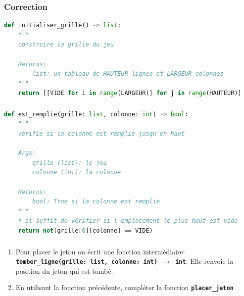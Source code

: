 \documentclass[svgnames,11pt]{beamer}
\begin{document}
\begin{frame}[fragile]
    \frametitle{Correction}

\begin{center}
\begin{lstlisting}[language=Python , basicstyle=\ttfamily\small, xleftmargin=1em, xrightmargin=0em]
def initialiser_grille() -> list:
    """
    construire la grille du jeu

    Returns:
        list: un tableau de HAUTEUR lignes et LARGEUR colonnes
    """
    return [[VIDE for i in range(LARGEUR)] for j in range(HAUTEUR)]
\end{lstlisting}
\label{CODE}
\end{center}  

\end{frame}
\begin{frame}[fragile]
    \frametitle{}
\begin{center}
\begin{lstlisting}[language=Python , basicstyle=\ttfamily\small, xleftmargin=1em, xrightmargin=-.5em]
def est_remplie(grille: list, colonne: int) -> bool:
    """
    vérifie si la colonne est remplie jusqu'en haut

    Args:
        grille (list): le jeu
        colonne (int): la colonne

    Returns:
        bool: True si la colonne est remplie
    """
    # il suffit de vérifier si l'emplacement le plus haut est vide
    return not(grille[0][colonne] == VIDE)
\end{lstlisting}
\label{CODE}
\end{center}
    

\end{frame}
\begin{frame}
    \frametitle{}

    \begin{activite}    
        \begin{enumerate}
            \item Pour placer le jeton on écrit une fonction intermédiaire: \textbf{\texttt{tomber\_ligne(grille: list, colonne: int) $\rightarrow$ int}}. Elle renvoie la position du jeton qui est tombé.
            \item En utilisant la fonction précédente, compléter la fonction \textbf{\texttt{placer\_jeton}}
        \end{enumerate}
    \end{activite}

\end{frame}
\end{document}
